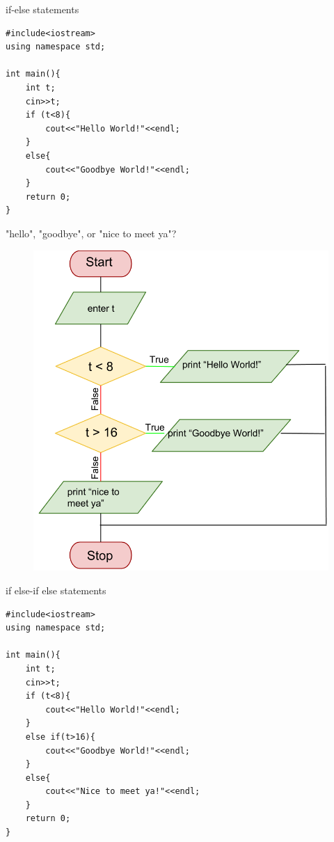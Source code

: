 \documentclass[xcolor={dvipsnames}]{beamer}
\begin{document}
\begin{frame}[fragile]{if-else statements}
\begin{verbatim}
#include<iostream>
using namespace std;

int main(){
    int t;
    cin>>t;
    if (t<8){
        cout<<"Hello World!"<<endl;
    }
    else{
        cout<<"Goodbye World!"<<endl;
    }
    return 0;
}
\end{verbatim}
\end{frame}

\begin{frame}{"hello", "goodbye", or "nice to meet ya"?}
	\begin{center}	
	\begin{figure}
		\includegraphics[width=.7\textwidth]{hellogoodbyenice}
	\end{figure}
	\end{center}
\end{frame}

\begin{frame}[fragile]{if else-if else statements}
\begin{verbatim}
#include<iostream>
using namespace std;

int main(){
    int t;
    cin>>t;
    if (t<8){
        cout<<"Hello World!"<<endl;
    }
    else if(t>16){
        cout<<"Goodbye World!"<<endl;
    }
    else{
        cout<<"Nice to meet ya!"<<endl;
    }
    return 0;
}
\end{verbatim}
\end{frame}
\end{document}
